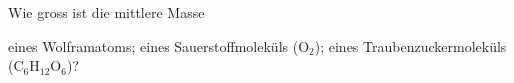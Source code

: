 Wie gross ist die mittlere Masse
\begin{abcliste}
\abc eines Wolframatoms;
\abc eines Sauerstoffmoleküls ($\mathrm{O_2}$);
\abc eines Traubenzuckermoleküls ($\mathrm{C_6H_{12}O_6}$)?
\end{abcliste}
